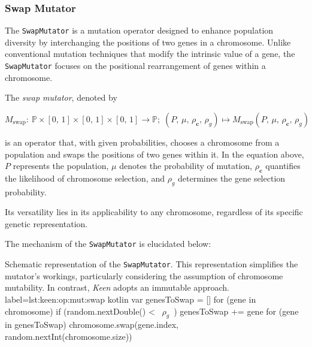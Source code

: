 
\subsubsection{Swap Mutator}
\label{sec:keen:op:mut:swap}
  The \texttt{SwapMutator} is a mutation operator designed to enhance 
  population diversity by interchanging the positions of two genes in a 
  chromosome. Unlike conventional mutation techniques that modify the intrinsic 
  value of a gene, the \texttt{SwapMutator} focuses on the positional 
  rearrangement of genes within a chromosome.

  \begin{definition}
  \label{def:keen:op:mut:swap}
    The \emph{swap mutator}, denoted by

    \begin{equation}
      M_\mathrm{swap} :\: \mathbb{P} \times [0,\, 1] \times [0,\, 1] 
        \times [0,\, 1] \to \mathbb{P};\;
      (P,\, \mu,\, \rho_\mathbf{c},\, \rho_g) 
        \mapsto M_\mathrm{swap}(P,\, \mu,\, \rho_\mathbf{c},\, \rho_g)
    \end{equation}

    is an operator that, with given probabilities, chooses a chromosome from a 
    population and swaps the positions of two genes within it. In the equation 
    above, \(P\) represents the population, \(\mu\) denotes the probability of 
    mutation, \(\rho_\mathbf{c}\) quantifies the likelihood of chromosome 
    selection, and \(\rho_g\) determines the gene selection probability.

    Its versatility lies in its applicability to any chromosome, regardless of 
    its specific genetic representation.
  \end{definition}

  The mechanism of the \texttt{SwapMutator} is elucidated below:

  \begin{code}{
    Schematic representation of the \texttt{SwapMutator}. This representation simplifies the mutator's workings, particularly considering the assumption of chromosome mutability. In contrast, \textit{Keen} adopts an immutable approach.
  }{
    label=lst:keen:op:mut:swap
  }{kotlin}
    var genesToSwap = []
    for (gene in chromosome) {
        if (random.nextDouble() < ~\(\rho_g\)~) {
            genesToSwap += gene
        }
    }
    for (gene in genesToSwap) {
        chromosome.swap(gene.index, random.nextInt(chromosome.size))
    }
  \end{code}

